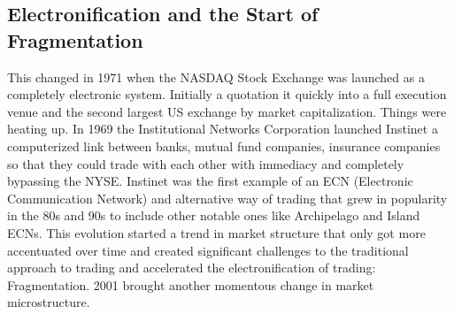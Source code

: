 \subsection{Electronification and the Start of Fragmentation}
This changed in 1971 when the NASDAQ Stock Exchange was launched as a completely electronic system. Initially  a quotation it quickly into a full execution venue and the second largest US exchange by market capitalization. Things were heating up. In 1969 the Institutional Networks Corporation launched Instinet a computerized link between banks, mutual fund companies, insurance companies so that they could trade with each other with immediacy and completely bypassing the NYSE.  Instinet was the first example of an ECN (Electronic Communication Network) and alternative way of trading that grew in popularity in the 80s and 90s to include other notable ones like Archipelago and Island ECNs. This evolution started a trend in market structure that only got more accentuated over time and created significant challenges to the traditional approach to trading and accelerated the electronification of trading: Fragmentation. 2001 brought another momentous change in market microstructure. 

